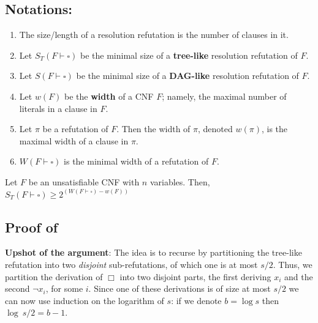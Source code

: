 \subsection*{Notations:}
\begin{enumerate}
    \item The size/length of a resolution refutation is the number of clauses in it.
    \item Let $S_T(F \vdash \square)$ be the minimal size of a \textbf{tree-like} resolution refutation of $F$.
    \item Let $S(F \vdash \square)$ be the minimal size of a \textbf{DAG-like} resolution refutation of $F$.
    \item Let $w(F)$ be the \textbf{width} of a CNF $F$; namely, the maximal number of literals in a clause in $F$.
    \item Let $\pi$ be a refutation of $F$. Then the width of $\pi$, denoted $w(\pi)$, is the maximal width of a clause in $\pi$.
    \item $W(F \vdash \square)$ is the minimal width of a refutation of $F$.
\end{enumerate}


\begin{tcolorbox}[colframe=white, colback=blue!4, boxrule=0mm, sharp corners]
\begin{theorem}
\label{thm:tree-like-sw}
Let $F$ be an unsatisfiable CNF with $n$ variables. Then, $S_T(F \vdash \square) \geq 2^{(W(F \vdash \square) - w(F))}$
\end{theorem}
\end{tcolorbox}


\subsection{Proof of }



\noindent \textbf{Upshot of the argument}:
The idea is to  recurse by partitioning the tree-like refutation into two \emph{disjoint} sub-refutations, of which one is at most $s/2$. Thus, we partition the derivation of $\Box$ into two disjoint parts, the first deriving $x_i$ and the second $\neg x_i$, for some $i$. Since one of these derivations is of size at most $s/2$ we can now use induction on the logarithm of $s$: if we denote $b=\log s$ then $\log\ s/2 =b-1$. 
\bigskip 


